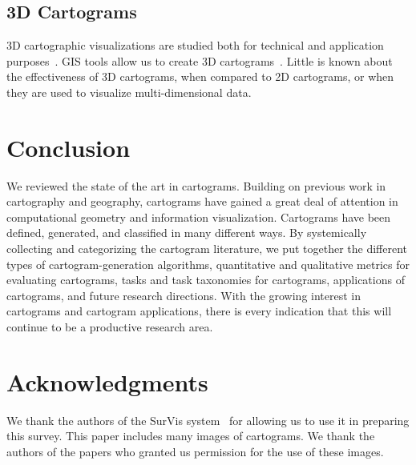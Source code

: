 \documentclass{egpubl}
\begin{document}
\begin{comment}
\end{itemize}

Merging both data and uncertainty and visually compare/combine those could be challenging. Research shows that it is difficult to compare the magnitudes of two attributes in multivariate visualizations when they are represented using different methods (e.g., size and color)~\cite{ramachandran2009visualizing}. As explained in section~\ref{multivar}, mapping both data and uncertainty in the same map (bivariate choropleth maps) can make the maps cluttered. Since cartograms show the data magnitude with size, using one of the other techniques (focus, clarity, fog etc.) could be used to uncertainty. Cartograms need to explored as means to effectively communicate data and uncertainty. 
\end{comment}

\subsection{3D Cartograms}

 3D cartographic visualizations are studied both for technical and application purposes~\cite{KNP04, nollenburg2007geographic, WP-3D}. GIS tools allow us to create 3D cartograms~\cite{3d-carto1}. Little is known about the effectiveness of 3D cartograms, when compared to 2D cartograms, or when they are used to visualize multi-dimensional data.


\section{Conclusion}
We reviewed the state of the art in cartograms. Building on previous work in cartography and geography, cartograms have gained a great deal of attention in computational geometry and information visualization. Cartograms have been defined, generated, and classified in many different ways. 
By systemically collecting and categorizing the cartogram literature, we put together the different types of cartogram-generation algorithms, quantitative and qualitative metrics for evaluating cartograms, tasks and task taxonomies for cartograms, applications of cartograms, and future research directions.
With the growing interest in cartograms and cartogram applications, there is every indication that this will continue to be a productive research area. 



\section*{Acknowledgments}
We thank the authors of the SurVis system~\cite{beck2016visual} for allowing us to use it in preparing this survey.
This paper includes many images of cartograms. We thank the authors of the papers who granted us permission for the use of these images.
\end{document}
